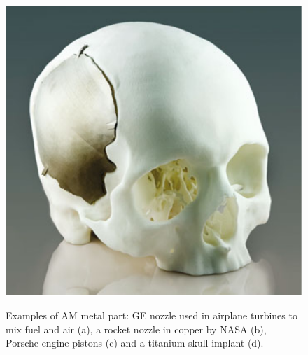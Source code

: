 \begin{figure}
{        \includegraphics[scale=0.20]{Images/skull.png}
    }
    
    \caption[Examples of AM in metals.]{Examples of AM metal part: GE nozzle used in airplane turbines to mix fuel and air (a), a rocket nozzle in copper by NASA (b), Porsche engine pistons (c) and a titanium skull implant (d).}
    \label{fig:amexamples}
\end{figure}
